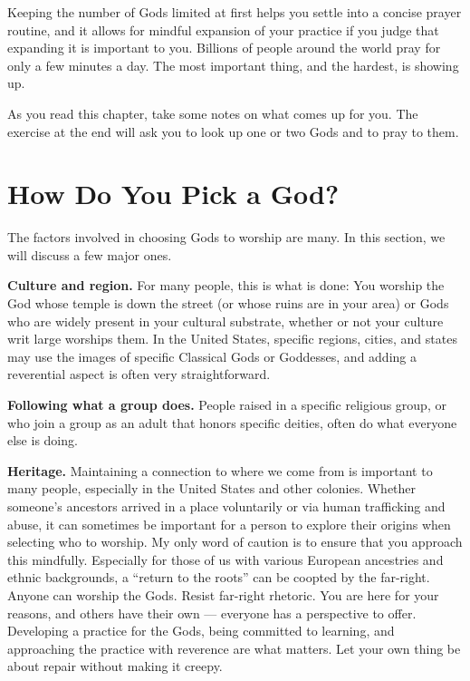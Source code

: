 \documentclass[
]{book}
\begin{document}
Keeping the number of Gods limited at first helps you settle into a concise prayer routine, and it allows for mindful expansion of your practice if you judge that expanding it is important to you. Billions of people around the world pray for only a few minutes a day. The most important thing, and the hardest, is showing up.

As you read this chapter, take some notes on what comes up for you. The exercise at the end will ask you to look up one or two Gods and to pray to them.

\hypertarget{how-do-you-pick-a-god}{%
\section{How Do You Pick a God?}\label{how-do-you-pick-a-god}}

The factors involved in choosing Gods to worship are many. In this section, we will discuss a few major ones.

\textbf{Culture and region.} For many people, this is what is done: You worship the God whose temple is down the street (or whose ruins are in your area) or Gods who are widely present in your cultural substrate, whether or not your culture writ large worships them. In the United States, specific regions, cities, and states may use the images of specific Classical Gods or Goddesses, and adding a reverential aspect is often very straightforward.

\textbf{Following what a group does.} People raised in a specific religious group, or who join a group as an adult that honors specific deities, often do what everyone else is doing.

\textbf{Heritage.} Maintaining a connection to where we come from is important to many people, especially in the United States and other colonies. Whether someone's ancestors arrived in a place voluntarily or via human trafficking and abuse, it can sometimes be important for a person to explore their origins when selecting who to worship. My only word of caution is to ensure that you approach this mindfully. Especially for those of us with various European ancestries and ethnic backgrounds, a ``return to the roots'' can be coopted by the far-right. Anyone can worship the Gods. Resist far-right rhetoric. You are here for your reasons, and others have their own --- everyone has a perspective to offer. Developing a practice for the Gods, being committed to learning, and approaching the practice with reverence are what matters. Let your own thing be about repair without making it creepy.
\end{document}
